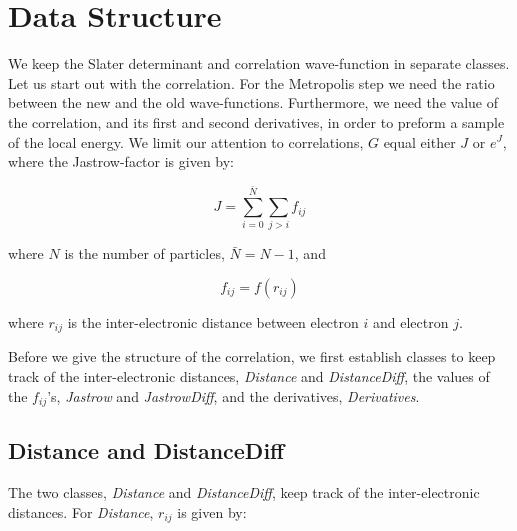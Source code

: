 
\section{Data Structure}

We keep the Slater determinant and correlation wave-function in
separate classes. Let us start out with the correlation. For the
Metropolis step we need the ratio between the new and the old
wave-functions. Furthermore, we need the value of the correlation, and
its first and second derivatives, in order to preform a sample of the
local energy. \newline
We limit our attention to correlations, $G$ equal either $J$ or $e^J$,
where the Jastrow-factor is given by: 

\begin{equation}
  J = \sum_{i=0}^{\bar{N}}\sum_{j > i} f_{ij}
\end{equation}

where $N$ is the number of particles, $\bar{N}=N-1$, and

\begin{equation}
  f_{ij} = f(r_{ij})
\end{equation}

where $r_{ij}$ is the inter-electronic distance between electron $i$
and electron $j$.

Before we give the structure of the correlation, we first establish
classes to keep track of the inter-electronic distances,
\emph{Distance} and \emph{DistanceDiff}, the values of the $f_{ij}$'s,
\emph{Jastrow} and \emph{JastrowDiff}, and the derivatives,
\emph{Derivatives}.




\subsection{Distance and DistanceDiff} 

The two classes, \emph{Distance} and \emph{DistanceDiff}, keep track
of the inter-electronic distances.  \newline
For \emph{Distance}, $r_{ij}$ is given by:

